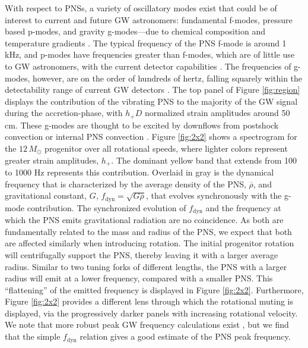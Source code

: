 \documentclass[twocolumn,times]{aastex62}  %
\begin{document}
With respect to PNSs, a variety of oscillatory modes exist that could be of interest to current and future GW astronomers: fundamental f-modes, pressure based p-modes, and gravity g-modes---due to chemical composition and temperature gradients \citep{unno:1989}.  The typical frequency of the PNS f-mode is around 1 kHz, and p-modes have frequencies greater than f-modes, which are of little use to GW astronomers, with the current detector capabilities \citep{ho:2018}.  
The frequencies of g-modes, however, are on the order of hundreds of hertz, falling squarely within the detectability range of current GW detectors \citep{martynov:2016}.  
The top panel of Figure \ref{fig:region} displays the contribution of the vibrating PNS to the majority of the GW signal during the accretion-phase, with $h_+D$ normalized strain amplitudes around 50 cm.  
These g-modes are thought to be excited by downflows from postshock convection or internal PNS convection \citep{marek:2009b,murphy:2009,muller:2013}.  
Figure \ref{fig:2x2} shows a spectrogram for the $12 \, M_\odot$ progenitor over all rotational speeds, where lighter colors represent greater strain amplitudes, $h_+$.  The dominant yellow band that extends from 100 to 1000 Hz represents this contribution.  
Overlaid in gray is the dynamical frequency that is characterized by the average density of the PNS, $\overline{\rho}$, and gravitational constant, $G$, $f_\mathrm{dyn} = \sqrt{G \overline{\rho}}$,  that evolves synchronously with the g-mode contribution.  The synchronized evolution of $f_\mathrm{dyn}$ and the frequency at which the PNS emits gravitational radiation are no coincidence.  As both are fundamentally related to the mass and radius of the PNS, we expect that both are affected similarly when introducing rotation.  The initial progenitor rotation will centrifugally support the PNS, thereby leaving it with a larger average radius.  Similar to two tuning forks of different lengths, the PNS with a larger radius will emit at a lower frequency, compared with a smaller PNS.  This ``flattening'' of the emitted frequency is displayed in Figure \ref{fig:2x2}.  Furthermore, Figure \ref{fig:2x2} provides a different lens through which the rotational muting is displayed, via the progressively darker panels with increasing rotational velocity.  We note that more robust peak GW frequency calculations exist \citep[e.g.,][]{muller:2013,moro:2018}, but we find that the simple $f_\mathrm{dyn}$ relation gives a good estimate of the PNS peak frequency.
\end{document}
